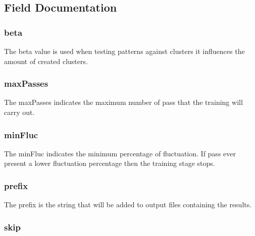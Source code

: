 \subsection{Field Documentation}
\hypertarget{struct_in_param_ab146b9cbab6e73e7588b240dc709fe01}{
\subsubsection[{beta}]{\setlength{\rightskip}{0pt plus 5cm}beta}}\label{struct_in_param_ab146b9cbab6e73e7588b240dc709fe01}
The beta value is used when testing patterns against clusters it influences the amount of created clusters. \hypertarget{struct_in_param_aee3a18897dc672ba38e5a3a48b391bf5}{
\subsubsection[{max\-Passes}]{\setlength{\rightskip}{0pt plus 5cm}max\-Passes}}\label{struct_in_param_aee3a18897dc672ba38e5a3a48b391bf5}
The max\-Passes indicates the maximum number of pass that the training will carry out. \hypertarget{struct_in_param_a342fcb2317908701d8574b9c0e7c8bd1}{
\subsubsection[{min\-Fluc}]{\setlength{\rightskip}{0pt plus 5cm}min\-Fluc}}\label{struct_in_param_a342fcb2317908701d8574b9c0e7c8bd1}
The min\-Fluc indicates the minimum percentage of fluctuation. If pass ever present a lower fluctuation percentage then the training stage stops. \hypertarget{struct_in_param_a74f24df2ba8ea34ebc927809d25a14ef}{
\subsubsection[{prefix}]{\setlength{\rightskip}{0pt plus 5cm}prefix}}\label{struct_in_param_a74f24df2ba8ea34ebc927809d25a14ef}
The prefix is the string that will be added to output files containing the results. \hypertarget{struct_in_param_a84926deb45bc620f21afab303b9114c3}{
\subsubsection[{skip}]{\setlength{\rightskip}{0pt plus 5cm}skip}}\label{struct_in_param_a84926deb45bc620f21afab303b9114c3}
